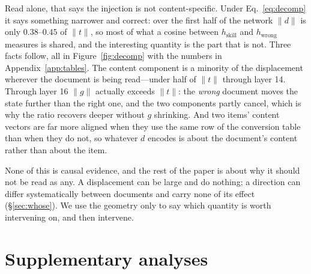 \documentclass{article}
\newcommand{\dvec}{\ensuremath{d}}
\newcommand{\gvec}{\ensuremath{g}}
\newcommand{\tvec}{\ensuremath{t}}
\begin{document}
Read alone, that says the injection is not content-specific. Under
Eq.~\ref{eq:decomp} it says something narrower and correct: over the first half
of the network $\|\dvec\|$ is only $0.38$--$0.45$ of $\|\tvec\|$, so most of what
a cosine between $h_{\text{skill}}$ and $h_{\text{wrong}}$ measures is shared,
and the interesting quantity is the part that is not. Three facts follow, all in
Figure~\ref{fig:decomp} with the numbers in Appendix~\ref{app:tables}. The
content component is a minority of the displacement wherever the document is
being read---under half of $\|\tvec\|$ through layer 14. Through layer 16
$\|\gvec\|$ actually exceeds $\|\tvec\|$: the \emph{wrong} document moves the
state further than the right one, and the two components partly cancel, which is
why the ratio recovers deeper without $\gvec$ shrinking. And two items' content
vectors are far more aligned when they use the same row of the conversion table
than when they do not, so whatever $\dvec$ encodes is about the document's
content rather than about the item.



None of this is causal evidence, and the rest of the paper is about why it
should not be read as any. A displacement can be large and do nothing; a
direction can differ systematically between documents and carry none of its
effect (\S\ref{sec:whose}). We use the geometry only to say which quantity is worth
intervening on, and then intervene.


\clearpage

\section{Supplementary analyses}
\label{app:moved}

\begin{table}[h]
\caption{The channel and the truncation curve at three model widths, each with
its own restricted split and its own injection layer at matched relative depth.
$\rho$ is Eq.~\ref{eq:rho}; \emph{gold} is what the document itself is worth on
that model's restricted items, which is why the $0.6$B and $1.7$B rows have low
absolute accuracy and a large $n$: those models solve almost nothing without the
document, so almost every item qualifies. Qwen3-0.6B and Qwen3-8B are after the
instrument fix; Qwen3-1.7B is before it, and its curve is not monotone, so its
$k^{*}$ is not interpretable. $k^{*}$ sits between $32$ and $64$ at $d=1024$
and at $d=4096$ alike; a width-proportional account predicts $k\approx12$ for
the first. Mistral-7B is in Table~\ref{tab:replicationfull}.}
\label{tab:laddermodels}
\centering
\footnotesize
\setlength{\tabcolsep}{3pt}

\end{table}
\end{document}
